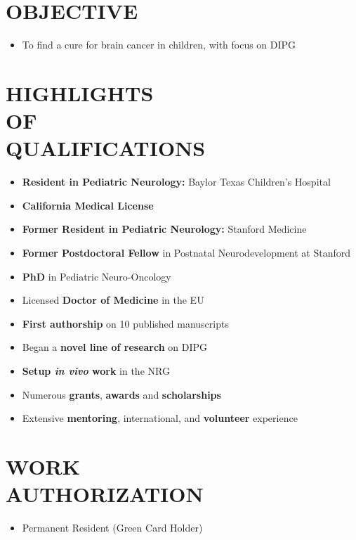 \documentclass[line,margin]{res}
\begin{document}
\begin{resume}

\section{OBJECTIVE}
\begin{itemize}
\item {\small To find a cure for brain cancer in children, with focus on DIPG}
\end{itemize}

\section{HIGHLIGHTS \\ OF \\ QUALIFICATIONS}
\begin{itemize}
  \item {\small {\bf Resident in Pediatric Neurology:} Baylor Texas Children's Hospital}
  \item {\small {\bf California Medical License}}
  \item {\small {\bf Former Resident in Pediatric Neurology:} Stanford Medicine}
  \item {\small {\bf Former Postdoctoral Fellow} in Postnatal Neurodevelopment at Stanford}
  \item {\small {\bf PhD} in Pediatric Neuro-Oncology}
  \item {\small Licensed {\bf Doctor of Medicine} in the EU}
  \item {\small {\bf First authorship} on 10 published manuscripts}
  \item {\small Began a {\bf novel line of research} on DIPG}
  \item {\small {\bf Setup \emph{in vivo} work} in the NRG}
  \item {\small Numerous {\bf grants}, {\bf awards} and {\bf scholarships}}
  \item {\small Extensive {\bf mentoring}, international, and {\bf volunteer} experience}
\end{itemize}

\section{WORK \\ AUTHORIZATION}
\begin{itemize}
\item Permanent Resident (Green Card Holder)
\end{itemize}


\end{resume}
\end{document}
